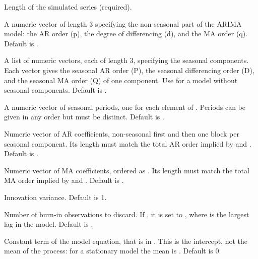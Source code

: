 \documentclass[a4paper]{book}
\begin{document}
\begin{Arguments}
\begin{ldescription}
\item[\code{nsim}] Length of the simulated series (required).

\item[\code{order}] A numeric vector of length 3 specifying the non-seasonal part of the
ARIMA model: the AR order (p), the degree of differencing (d), and the MA order (q).
Default is .

\item[\code{seasonal}] A list of numeric vectors, each of length 3, specifying the seasonal
components. Each vector gives the seasonal AR order (P), the seasonal differencing
order (D), and the seasonal MA order (Q) of one component. Use  for a
model without seasonal components. Default is .

\item[\code{seasonal.period}] A numeric vector of seasonal periods, one for each element of
. Periods can be given in any order but must be distinct.
Default is .

\item[\code{ar}] Numeric vector of AR coefficients, non-seasonal first and then one block per
seasonal component. Its length must match the total AR order implied by 
and . Default is .

\item[\code{ma}] Numeric vector of MA coefficients, ordered as . Its length must match
the total MA order implied by  and . Default is .

\item[\code{sigma2}] Innovation variance. Default is 1.

\item[\code{burn}] Number of burn-in observations to discard. If , it is set to
, where  is the largest lag in the model.
Default is .

\item[\code{intercept}] Constant term of the model equation, that is \eqn{\mu}{} in
. This is the
intercept, not the mean of the process: for a stationary model the mean is
. Default is 0.
\end{ldescription}
\end{Arguments}
\end{document}
